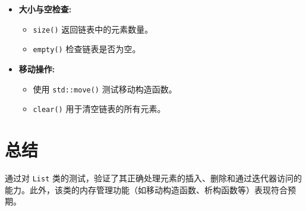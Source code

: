 \documentclass{article}
\begin{document}
\begin{itemize}
    \item \textbf{大小与空检查:}
        \begin{itemize}
            \item \texttt{size()} 返回链表中的元素数量。
            \item \texttt{empty()} 检查链表是否为空。
        \end{itemize}
    \item \textbf{移动操作:}
        \begin{itemize}
            \item 使用 \texttt{std::move()} 测试移动构造函数。
            \item \texttt{clear()} 用于清空链表的所有元素。
        \end{itemize}
\end{itemize}

\section{总结}
通过对 \texttt{List} 类的测试，验证了其正确处理元素的插入、删除和通过迭代器访问的能力。此外，该类的内存管理功能（如移动构造函数、析构函数等）表现符合预期。
\end{document}
